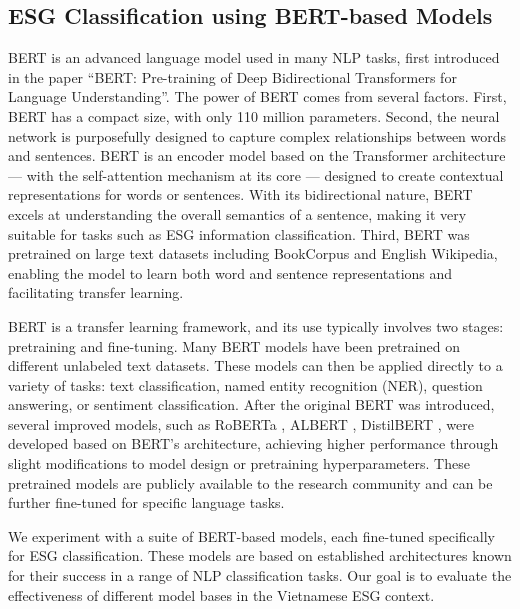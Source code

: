 \documentclass[12pt, letterpaper]{template}
\begin{document}
\subsection{ESG Classification using BERT-based Models} 

BERT \citep{bert} is an advanced language model used in many NLP tasks, first introduced in the paper “BERT: Pre-training of Deep Bidirectional Transformers for Language Understanding”. The power of BERT comes from several factors. First, BERT has a compact size, with only 110 million parameters. Second, the neural network is purposefully designed to capture complex relationships between words and sentences. BERT is an encoder model based on the Transformer \citep{transformer} architecture — with the self-attention mechanism at its core — designed to create contextual representations for words or sentences. With its bidirectional nature, BERT excels at understanding the overall semantics of a sentence, making it very suitable for tasks such as ESG information classification. Third, BERT was pretrained on large text datasets including BookCorpus and English Wikipedia, enabling the model to learn both word and sentence representations and facilitating transfer learning.

BERT is a transfer learning framework, and its use typically involves two stages: pretraining and fine-tuning. Many BERT models have been pretrained on different unlabeled text datasets. These models can then be applied directly to a variety of tasks: text classification, named entity recognition (NER), question answering, or sentiment classification. After the original BERT was introduced, several improved models, such as RoBERTa \citep{roberta}, ALBERT \citep{albert}, DistilBERT \citep{distilbert}, were developed based on BERT’s architecture, achieving higher performance through slight modifications to model design or pretraining hyperparameters. These pretrained models are publicly available to the research community and can be further fine-tuned for specific language tasks.

We experiment with a suite of BERT-based models, each fine-tuned specifically for ESG classification. These models are based on established architectures known for their success in a range of NLP classification tasks. Our goal is to evaluate the effectiveness of different model bases in the Vietnamese ESG context.

\end{document}
